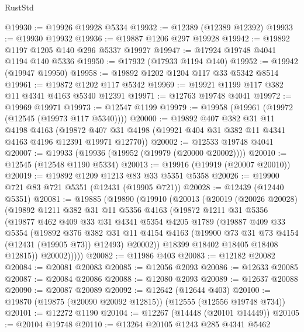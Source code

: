 \begin{lexlean}{RustStd}
\begin{coremodule}
@19930 := @19926 @19928 @5334
@19932 := @12389 (@12389 @12392)
@19933 := @19930 @19932
@19936 := @19887 @1206 @297 @19928
@19942 := @19892 @1197 @1205 @140 @296 @5337 @19927
@19947 := @17924 @19748 @4041 @1194 @140 @5336
@19950 := @17932 (@17933 @1194 @140)
@19952 := @19942 (@19947 @19950)
@19958 := @19892 @1202 @1204 @117 @33 @5342 @8514
@19961 := @19872 @1202 @117 @5342
@19969 := @19921 @1199 @117 @382 @11 @4341 @4163 @5340 @12391
@19971 := @12763 @19748 @4041
@19972 := @19969 @19971
@19973 := @12547 @1199
@19979 := @19958 (@19961 (@19972 (@12545 (@19973 @117 @5340))))
@20000 := @19892
    @407
    @382
    @31
    @11
    @4198
    @4163
    (@19872 @407 @31 @4198 (@19921 @404 @31 @382 @11 @4341 @4163 @4196 @12391 @19971 @12770))
@20002 := @12533 @19748 @4041
@20007 := @19933 (@19936 (@19952 (@19979 (@20000 @20002))))
@20010 := @12545 (@12548 @1190 @5334)
@20013 := @19916 (@19919 (@20007 @20010))
@20019 := @19892 @1209 @1213 @83 @33 @5351 @5358
@20026 := @19900 @721 @83 @721 @5351 (@12431 (@19905 @721))
@20028 := @12439 (@12440 @5351)
@20081 := @19885
    (@19890
      (@19910
        (@20013
          (@20019
            (@20026 @20028)
            (@19892
              @1211
              @382
              @31
              @11
              @5356
              @4163
              (@19872
                @1211
                @31
                @5356
                (@19877
                  @462
                  @409
                  @33
                  @31
                  @4341
                  @5354
                  @4205
                  @1789
                  (@19887
                    @409
                    @33
                    @5354
                    (@19892
                      @376
                      @382
                      @31
                      @11
                      @4154
                      @4163
                      (@19900 @73 @31 @73 @4154 (@12431 (@19905 @73)) @12493)
                      @20002))
                  @18399
                  @18402
                  @18405
                  @18408
                  @12815))
              @20002)))))
@20082 := @11986 @403
@20083 := @12182 @20082
@20084 := @20081 @20083
@20085 := @12056 @2093
@20086 := @12633 @20085
@20087 := @20084 @20086
@20088 := @12080 @2093
@20089 := @12637 @20088
@20090 := @20087 @20089
@20092 := @12642 (@12644 @403)
@20100 := @19870 (@19875 (@20090 @20092 @12815)) (@12555 (@12556 @19748 @734))
@20101 := @12272 @1190
@20104 := @12267 (@14448 (@20101 @14449))
@20105 := @20104 @19748
@20110 := @13264 @20105 @1243 @285 @4341 @5462

\end{coremodule}
\end{lexlean}
